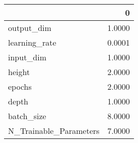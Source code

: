 \begin{tabular}{lr}
\toprule
{} &       0 \\
\midrule
output\_dim             &  1.0000 \\
learning\_rate          &  0.0001 \\
input\_dim              &  1.0000 \\
height                 &  2.0000 \\
epochs                 &  2.0000 \\
depth                  &  1.0000 \\
batch\_size             &  8.0000 \\
N\_Trainable\_Parameters &  7.0000 \\
\bottomrule
\end{tabular}
